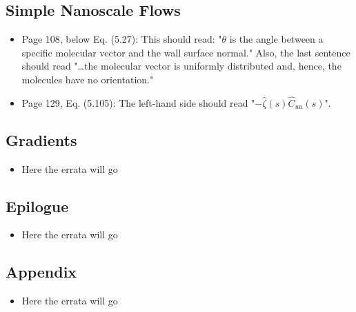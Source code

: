 \documentclass{article}
\begin{document}
\subsection*{Simple Nanoscale Flows}
\begin{itemize}
\item Page 108, below Eq. (5.27): This should read: "$\theta$ is the angle between a specific molecular vector 
and the wall surface normal." Also, the last sentence should read "\ldots the molecular vector is uniformly distributed and, hence, 
the molecules have no orientation."  
\item Page 129, Eq. (5.105): The left-hand side should read "$-\widehat{\zeta}(s)\widehat{C}_{uu}(s)$".
\end{itemize}

\subsection*{Gradients}
\begin{itemize}
\item Here the errata will go
\end{itemize}

\subsection*{Epilogue}
\begin{itemize}
\item Here the errata will go
\end{itemize}

\subsection*{Appendix}
\begin{itemize}
\item Here the errata will go
\end{itemize}
\end{document}
